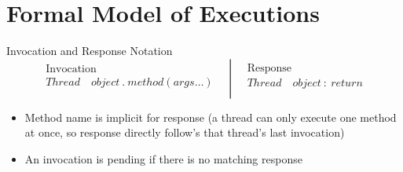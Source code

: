 \section{Formal Model of Executions}

\begin{definitionbox}{Invocation and Response Notation}
    \[\left. \begin{matrix}
        \text{Invocation} \\
        Thread \quad object \ . \ method(args \dots) \\
    \end{matrix} \quad \right\lvert \quad \begin{matrix}
        \text{Response} \\
        Thread \quad object \ : \ return \\
    \end{matrix}\]
    \begin{itemize}
        \item Method name is implicit for response (a thread can only execute one method at once, so response directly follow's that thread's last invocation)
        \item An invocation is pending if there is no matching response
    \end{itemize}
\end{definitionbox}
